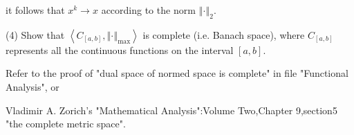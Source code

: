 \documentclass{article}
\begin{document}
it follows that $x^{k}\rightarrow x$ according to the norm $\left\Vert \cdot
\right\Vert _{2}.$

(4) Show that $\left\langle C_{[a,b]},\left\Vert \cdot \right\Vert _{\max
}\right\rangle $ is complete (i.e. Banach space), where $C_{[a,b]}$
represents all the continuous functions on the interval $[a,b].$

Refer to the proof of "dual space of normed space is complete" in file
"Functional Analysis", or 

Vladimir A. Zorich's "Mathematical Analysis":Volume Two,Chapter 9,section5
"the complete metric space".
\end{document}

